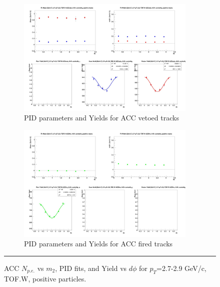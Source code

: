 \begin{figure}[H]
  \ContinuedFloat
    \begin{subfigure}{1\textwidth}
   \centering
   \includegraphics[width=0.94\textwidth]{hiptfits/pos/fitParams_tof2_cent0_ch1_pT-27-29.jpg}
    \caption{PID parameters and Yields for ACC vetoed tracks}
    \end{subfigure}    
    \begin{subfigure}{1\textwidth}
   \centering
   \includegraphics[width=0.94\textwidth]{hiptfits/pos/fitParams_tof3_cent0_ch1_pT-27-29.jpg}
    \caption{PID parameters and Yields for ACC fired tracks}
    \end{subfigure} 
    \rule{35em}{0.5pt}
  \caption[ACC $N_{p.e.}$ vs $m_2$, PID fits, and Yield vs $d\phi$ for $p_T$=2.7-2.9 GeV/c, TOF.W, positive particles.]{ACC $N_{p.e.}$ vs $m_2$, PID fits, and Yield vs $d\phi$ for $p_T$=2.7-2.9 GeV/c, TOF.W, positive particles.}
  \label{fig:acc27-29pos}
\end{figure}


